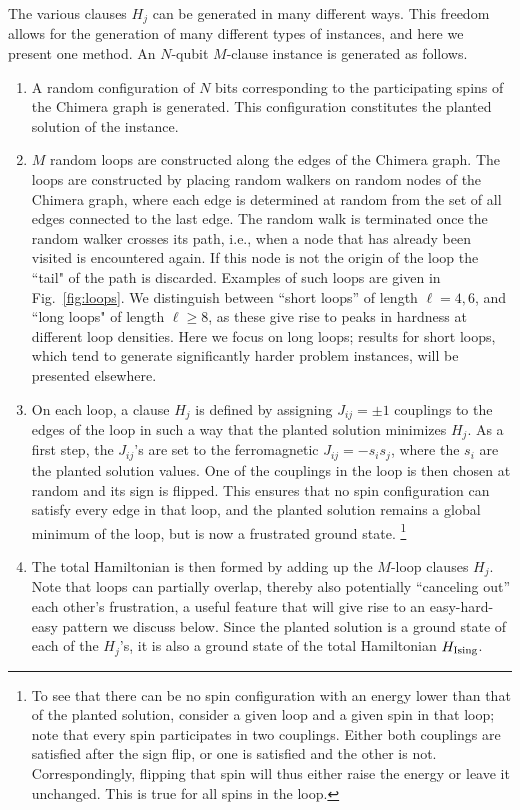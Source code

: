 The various clauses $H_j$ can be generated in many different ways.  This freedom allows for the generation of many different types of instances, and here we present one method.  An $N$-qubit $M$-clause instance is generated as follows.
%
\begin{enumerate}
\item
A random configuration of $N$ bits corresponding to the participating spins of the Chimera graph is generated.
This configuration constitutes the planted solution of the instance.
\item
$M$ random loops are constructed along the edges of the Chimera graph. The loops are constructed by placing random walkers on random nodes of the Chimera graph, where each edge is determined at random from the set of all edges connected to the last edge. The random walk is terminated once the random walker crosses its path, i.e., when a node that has already been visited is encountered again. If this node is not the origin of the loop the ``tail" of the path is discarded. Examples of such loops are given in Fig.~\ref{fig:loops}.
We distinguish between ``short loops'' of length $\ell=4,6$, and ``long loops" of length $\ell \geq 8$, as these give rise to peaks in hardness at different loop densities. Here we focus on long loops; results for short loops, which tend to generate significantly harder problem instances, will be presented elsewhere.
\item
On each loop, a clause $H_j$ is defined by assigning $J_{ij}=\pm1$ couplings to the edges of the loop in such a way that the planted solution minimizes $H_j$. As a first step, the $J_{ij}$'s are set to the ferromagnetic  $J_{ij}=-s_i s_j$, where the $s_i$ are the planted solution values. One of the couplings in the loop is then chosen at random and its sign is flipped.
This ensures that no spin configuration can satisfy every edge in that loop, and the planted solution remains a global minimum of the loop, but is now a frustrated ground state.%
\footnote{To see that there can be no spin configuration with an energy lower than that of the planted solution, consider a given loop and a given spin in that loop; note that every spin participates in two couplings. Either both couplings are satisfied after the sign flip, or one is satisfied and the other is not. Correspondingly, flipping that spin will thus either raise the energy or leave it unchanged. This is true for all spins in the loop.}
\item
The total Hamiltonian is then formed by adding up the $M$-loop clauses $H_j$. Note that loops can partially overlap, thereby also potentially ``canceling out''  each other's frustration, a useful feature that will give rise to an easy-hard-easy pattern we discuss below. Since the planted solution is a ground state of each of the $H_j$'s, it is also a ground state of the total Hamiltonian $H_{\textrm{Ising}}$.
\end{enumerate}

